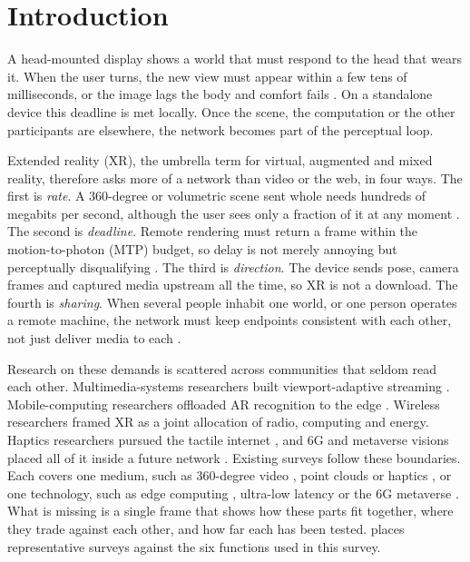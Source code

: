 \section{Introduction}\label{sec:intro}

A head-mounted display shows a world that must respond to the head that wears it. When the user turns,
the new view must appear within a few tens of milliseconds, or the image lags the body and comfort
fails \cite{W2784711283}. On a standalone device this deadline is met locally. Once the scene, the
computation or the other participants are elsewhere, the network becomes part of the perceptual loop.

Extended reality (XR), the umbrella term for virtual, augmented and mixed reality, therefore asks more of
a network than video or the web, in four ways. The first is \emph{rate}. A 360-degree or volumetric
scene sent whole needs hundreds of megabits per second, although the user sees only a fraction of it at
any moment \cite{W3038754372,W3096564590}. The second is \emph{deadline}. Remote rendering must return a
frame within the motion-to-photon (MTP) budget, so delay is not merely annoying but perceptually
disqualifying \cite{W2784711283}. The third is \emph{direction}. The device sends pose, camera frames and
captured media upstream all the time, so XR is not a download. The fourth is \emph{sharing}. When several
people inhabit one world, or one person operates a remote machine, the network must keep endpoints
consistent with each other, not just deliver media to each \cite{W2561715836}.

Research on these demands is scattered across communities that seldom read each other. Multimedia-systems
researchers built viewport-adaptive streaming \cite{W3038754372,W2971680322}. Mobile-computing
researchers offloaded AR recognition to the edge \cite{W3133913697}. Wireless researchers framed XR as a
joint allocation of radio, computing and energy. Haptics researchers pursued the tactile internet
\cite{W2811040154}, and 6G and metaverse visions placed all of it inside a future network
\cite{W4312940001,W4390204075}. Existing surveys follow these boundaries. Each covers one medium, such as
360-degree video \cite{W3038754372,W2971680322,W2917103012}, point clouds \cite{W3096564590} or haptics
\cite{W3088582486}, or one technology, such as edge computing \cite{W3133913697,W2902319104}, ultra-low
latency \cite{W4362585626} or the 6G metaverse \cite{W4312940001,W4315497913}. What is missing is a single
frame that shows how these parts fit together, where they trade against each other, and how far each has
been tested.  places representative surveys against the six functions used in this
survey.

